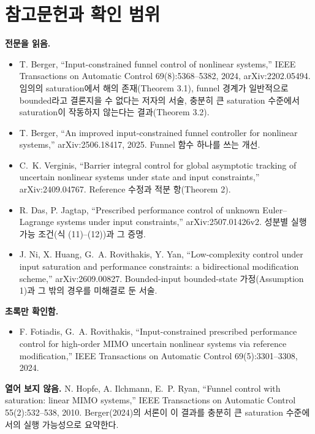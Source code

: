 \documentclass[11pt]{article}\usepackage[margin=1in]{geometry}\usepackage{amsmath,amssymb,amsthm,mathtools}\usepackage{graphicx}\graphicspath{{figures/}{../figures/}{figs/}{./}}\usepackage{enumitem}\usepackage{hyperref}\usepackage{cleveref}\usepackage{tikz}\usetikzlibrary{arrows.meta,positioning,calc,shapes.geometric}\usepackage{float}\usepackage[most]{tcolorbox}\usepackage{kotex}\usepackage{booktabs}\emergencystretch=1.6em\tolerance=2000 \crefname{assumption}{Assumption}{Assumptions}\Crefname{assumption}{Assumption}{Assumptions}\crefname{definition}{Definition}{Definitions}\Crefname{definition}{Definition}{Definitions}\crefname{proposition}{Proposition}{Propositions}\Crefname{proposition}{Proposition}{Propositions}\crefname{fact}{Fact}{Facts}\Crefname{fact}{Fact}{Facts} \newtheorem{assumption}{Assumption}\newtheorem{definition}{Definition}\newtheorem{lemma}{Lemma}\newtheorem{proposition}{Proposition}\newtheorem{theorem}{Theorem}\newtheorem{corollary}{Corollary}\newtheorem{fact}{Fact}\theoremstyle{remark}\newtheorem{remark}{Remark} \newcommand{\R}{\mathbb{R}}\newcommand{\U}{\mathcal U}
\begin{document}
\appendix

\section{참고문헌과 확인 범위}
\label{app:refs}

\textbf{전문을 읽음.}
\begin{itemize}
\item T. Berger, ``Input-constrained funnel control of nonlinear systems,'' IEEE Transactions on Automatic Control 69(8):5368--5382, 2024, arXiv:2202.05494. 임의의 saturation에서 해의 존재(Theorem 3.1), funnel 경계가 일반적으로 bounded라고 결론지을 수 없다는 저자의 서술, 충분히 큰 saturation 수준에서 saturation이 작동하지 않는다는 결과(Theorem 3.2).
\item T. Berger, ``An improved input-constrained funnel controller for nonlinear systems,'' arXiv:2506.18417, 2025. Funnel 함수 하나를 쓰는 개선.
\item C.~K. Verginis, ``Barrier integral control for global asymptotic tracking of uncertain nonlinear systems under state and input constraints,'' arXiv:2409.04767. Reference 수정과 적분 항(Theorem 2).
\item R. Das, P. Jagtap, ``Prescribed performance control of unknown Euler--Lagrange systems under input constraints,'' arXiv:2507.01426v2. 성분별 실행 가능 조건(식 (11)--(12))과 그 증명.
\item J. Ni, X. Huang, G.~A. Rovithakis, Y. Yan, ``Low-complexity control under input saturation and performance constraints: a bidirectional modification scheme,'' arXiv:2609.00827. Bounded-input bounded-state 가정(Assumption 1)과 그 밖의 경우를 미해결로 둔 서술.
\end{itemize}

\textbf{초록만 확인함.}
\begin{itemize}
\item F. Fotiadis, G.~A. Rovithakis, ``Input-constrained prescribed performance control for high-order MIMO uncertain nonlinear systems via reference modification,'' IEEE Transactions on Automatic Control 69(5):3301--3308, 2024.
\end{itemize}

\textbf{열어 보지 않음.} N. Hopfe, A. Ilchmann, E.~P. Ryan, ``Funnel control with saturation: linear MIMO systems,'' IEEE Transactions on Automatic Control 55(2):532--538, 2010. Berger(2024)의 서론이 이 결과를 충분히 큰 saturation 수준에서의 실행 가능성으로 요약한다.
\end{document}
